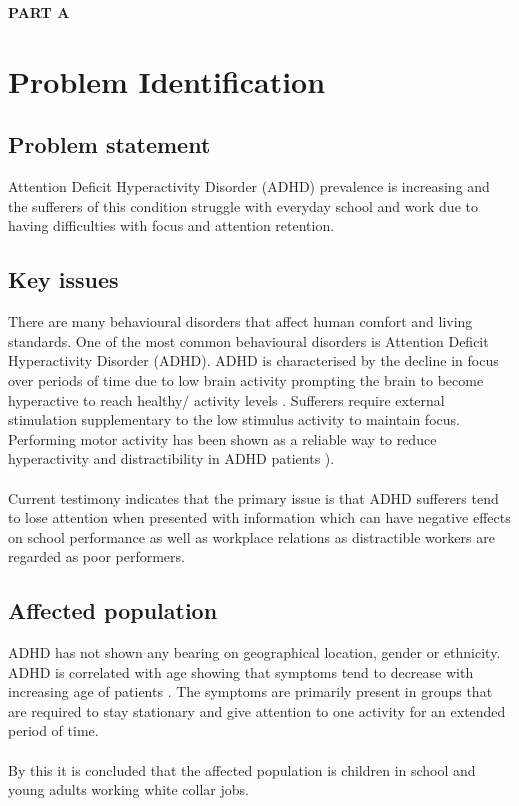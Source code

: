 %
  \huge{\bfseries{PART A}}
  \large 
  \section{Problem Identification}
    \subsection{Problem statement}
      Attention Deficit Hyperactivity Disorder (ADHD) prevalence is increasing
      and the sufferers of this condition struggle with everyday school and
      work due to having difficulties with focus and attention retention.

    \subsection{Key issues}
      There are many behavioural disorders that affect human comfort and living
      standards. One of the most common behavioural disorders is 
      Attention Deficit Hyperactivity Disorder (ADHD). ADHD is characterised by 
      the decline in focus over periods of time due to low  brain activity
      prompting the brain to become hyperactive to reach healthy/ activity 
      levels \cite{timothy}. Sufferers require external stimulation 
      supplementary to the low stimulus activity to maintain focus.
      Performing motor activity has been shown as a reliable way
      to reduce hyperactivity and distractibility in ADHD patients 
      \cite{azrin}).\\ \\
      Current testimony indicates that the primary issue is that ADHD sufferers
      tend to lose attention when presented with information which can have
      negative effects on school performance as well as workplace relations
      as distractible workers are regarded as poor performers.

    \subsection{Affected population}
      ADHD has not shown any bearing on geographical location, gender or
      ethnicity. ADHD is correlated with age showing that symptoms tend to
      decrease with increasing age of patients \cite{josephine}. The
      symptoms are primarily present in groups that are required to stay
      stationary and give attention to one activity for an extended period
      of time. \\ \\
      By this it is concluded that the affected population is children in 
      school and young adults working white collar jobs.

